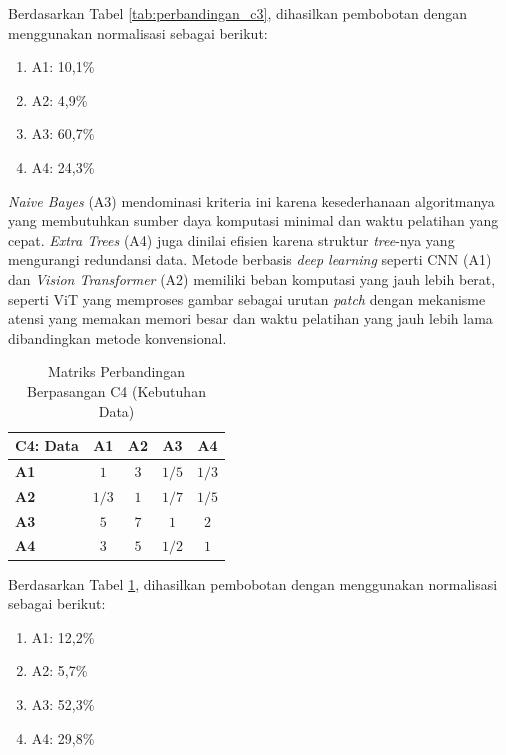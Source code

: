 \begin{enumerate}
	Berdasarkan Tabel \ref{tab:perbandingan_c3}, dihasilkan pembobotan dengan menggunakan normalisasi sebagai berikut:
	\begin{enumerate}
		\item A1: 10,1\%
		\item A2: 4,9\%
		\item A3: 60,7\%
		\item A4: 24,3\%\\
	\end{enumerate}
	
	\textit{Naive Bayes} (A3) mendominasi kriteria ini karena kesederhanaan algoritmanya yang membutuhkan sumber daya komputasi minimal dan waktu pelatihan yang cepat. \textit{Extra Trees} (A4) juga dinilai efisien karena struktur \textit{tree}-nya yang mengurangi redundansi data. Metode berbasis \textit{deep learning} seperti CNN (A1) dan \textit{Vision Transformer} (A2) memiliki beban komputasi yang jauh lebih berat, seperti ViT yang memproses gambar sebagai urutan \textit{patch} dengan mekanisme atensi yang memakan memori besar dan waktu pelatihan yang jauh lebih lama dibandingkan metode konvensional.
	
	\begin{table}[H]
		\centering
		\caption{Matriks Perbandingan Berpasangan C4 (Kebutuhan Data)}
		\label{tab:perbandingan_c4}
		\begin{tabular}{|l|c|c|c|c|}
			\hline
			\textbf{C4: Data} & \textbf{A1} & \textbf{A2} & \textbf{A3} & \textbf{A4} \\ \hline
			\textbf{A1} & $1$ & $3$ & $1/5$ & $1/3$ \\ \hline
			\textbf{A2} & $1/3$ & $1$ & $1/7$ & $1/5$ \\ \hline
			\textbf{A3} & $5$ & $7$ & $1$ & $2$ \\ \hline
			\textbf{A4} & $3$ & $5$ & $1/2$ & $1$ \\ \hline
		\end{tabular}
	\end{table}
	
	Berdasarkan Tabel \ref{tab:perbandingan_c4}, dihasilkan pembobotan dengan menggunakan normalisasi sebagai berikut:
	\begin{enumerate}
		\item A1: 12,2\%
		\item A2: 5,7\%
		\item A3: 52,3\%
		\item A4: 29,8\%\\
	\end{enumerate}
	

\end{enumerate}
